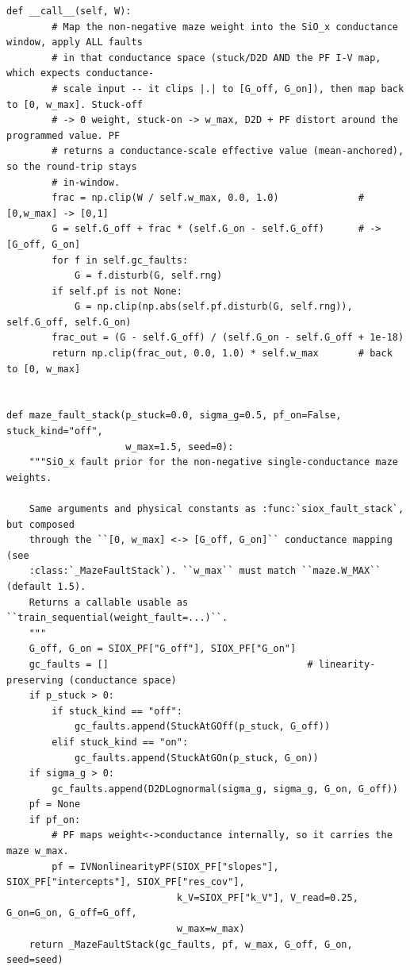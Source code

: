\begin{lstlisting}[caption={mrl\_trace/device\_faults.py},label={lst:siox-src-device_faults}]
    def __call__(self, W):
        # Map the non-negative maze weight into the SiO_x conductance window, apply ALL faults
        # in that conductance space (stuck/D2D AND the PF I-V map, which expects conductance-
        # scale input -- it clips |.| to [G_off, G_on]), then map back to [0, w_max]. Stuck-off
        # -> 0 weight, stuck-on -> w_max, D2D + PF distort around the programmed value. PF
        # returns a conductance-scale effective value (mean-anchored), so the round-trip stays
        # in-window.
        frac = np.clip(W / self.w_max, 0.0, 1.0)              # [0,w_max] -> [0,1]
        G = self.G_off + frac * (self.G_on - self.G_off)      # -> [G_off, G_on]
        for f in self.gc_faults:
            G = f.disturb(G, self.rng)
        if self.pf is not None:
            G = np.clip(np.abs(self.pf.disturb(G, self.rng)), self.G_off, self.G_on)
        frac_out = (G - self.G_off) / (self.G_on - self.G_off + 1e-18)
        return np.clip(frac_out, 0.0, 1.0) * self.w_max       # back to [0, w_max]


def maze_fault_stack(p_stuck=0.0, sigma_g=0.5, pf_on=False, stuck_kind="off",
                     w_max=1.5, seed=0):
    """SiO_x fault prior for the non-negative single-conductance maze weights.

    Same arguments and physical constants as :func:`siox_fault_stack`, but composed
    through the ``[0, w_max] <-> [G_off, G_on]`` conductance mapping (see
    :class:`_MazeFaultStack`). ``w_max`` must match ``maze.W_MAX`` (default 1.5).
    Returns a callable usable as ``train_sequential(weight_fault=...)``.
    """
    G_off, G_on = SIOX_PF["G_off"], SIOX_PF["G_on"]
    gc_faults = []                                   # linearity-preserving (conductance space)
    if p_stuck > 0:
        if stuck_kind == "off":
            gc_faults.append(StuckAtGOff(p_stuck, G_off))
        elif stuck_kind == "on":
            gc_faults.append(StuckAtGOn(p_stuck, G_on))
    if sigma_g > 0:
        gc_faults.append(D2DLognormal(sigma_g, sigma_g, G_on, G_off))
    pf = None
    if pf_on:
        # PF maps weight<->conductance internally, so it carries the maze w_max.
        pf = IVNonlinearityPF(SIOX_PF["slopes"], SIOX_PF["intercepts"], SIOX_PF["res_cov"],
                              k_V=SIOX_PF["k_V"], V_read=0.25, G_on=G_on, G_off=G_off,
                              w_max=w_max)
    return _MazeFaultStack(gc_faults, pf, w_max, G_off, G_on, seed=seed)
\end{lstlisting}

